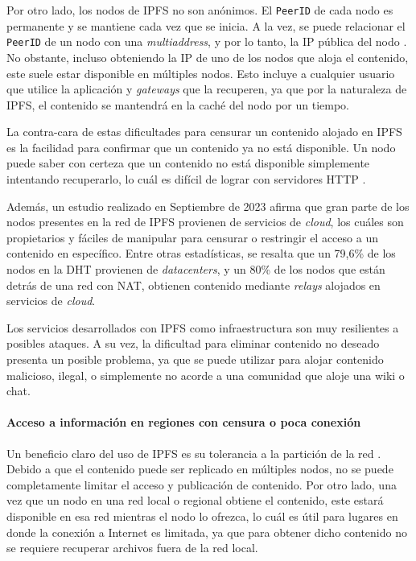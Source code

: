 Por otro lado, los nodos de IPFS no son anónimos. El \texttt{PeerID} de cada nodo es permanente y se mantiene cada vez que se inicia. A la vez, se puede relacionar el \texttt{PeerID} de un nodo con una \textit{multiaddress}, y por lo tanto, la IP pública del nodo \cite{privacy-ipfs}. No obstante, incluso obteniendo la IP de uno de los nodos que aloja el contenido, este suele estar disponible en múltiples nodos. Esto incluye a cualquier usuario que utilice la aplicación y \textit{gateways} que la recuperen, ya que por la naturaleza de IPFS, el contenido se mantendrá en la caché del nodo por un tiempo.

La contra-cara de estas dificultades para censurar un contenido alojado en IPFS es la facilidad para confirmar que un contenido ya no está disponible. Un nodo puede saber con certeza que un contenido no está disponible simplemente intentando recuperarlo, lo cuál es difícil de lograr con servidores HTTP \cite{doan2022decentralisedcloudstorageipfs}.

Además, un estudio realizado en Septiembre de 2023 \cite{Balduf_2023} afirma que gran parte de los nodos presentes en la red de IPFS provienen de servicios de \textit{cloud}, los cuáles son propietarios y fáciles de manipular para censurar o restringir el acceso a un contenido en específico. Entre otras estadísticas, se resalta que un 79,6\% de los nodos en la DHT provienen de \textit{datacenters}, y un 80\% de los nodos que están detrás de una red con NAT, obtienen contenido mediante \textit{relays} alojados en servicios de \textit{cloud}.

Los servicios desarrollados con IPFS como infraestructura son muy resilientes a posibles ataques. A su vez, la dificultad para eliminar contenido no deseado presenta un posible problema, ya que se puede utilizar para alojar contenido malicioso, ilegal, o simplemente no acorde a una comunidad que aloje una wiki o chat.

\paragraph{Acceso a información en regiones con censura o poca conexión} Un beneficio claro del uso de IPFS es su tolerancia a la partición de la red \cite{doan2022decentralisedcloudstorageipfs}. Debido a que el contenido puede ser replicado en múltiples nodos, no se puede completamente limitar el acceso y publicación de contenido. Por otro lado, una vez que un nodo en una red local o regional obtiene el contenido, este estará disponible en esa red mientras el nodo lo ofrezca, lo cuál es útil para lugares en donde la conexión a Internet es limitada, ya que para obtener dicho contenido no se requiere recuperar archivos fuera de la red local.

